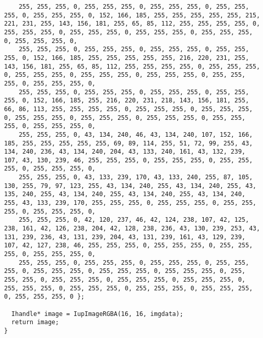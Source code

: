 \documentclass{ctexart}
\begin{document}
\begin{lstlisting}
    255, 255, 255, 0, 255, 255, 255, 0, 255, 255, 255, 0, 255, 255, 255, 0, 255, 255, 255, 0, 152, 166, 185, 255, 255, 255, 255, 255, 215, 221, 231, 255, 143, 156, 181, 255, 65, 85, 112, 255, 255, 255, 255, 0, 255, 255, 255, 0, 255, 255, 255, 0, 255, 255, 255, 0, 255, 255, 255, 0, 255, 255, 255, 0,
    255, 255, 255, 0, 255, 255, 255, 0, 255, 255, 255, 0, 255, 255, 255, 0, 152, 166, 185, 255, 255, 255, 255, 255, 216, 220, 231, 255, 143, 156, 181, 255, 65, 85, 112, 255, 255, 255, 255, 0, 255, 255, 255, 0, 255, 255, 255, 0, 255, 255, 255, 0, 255, 255, 255, 0, 255, 255, 255, 0, 255, 255, 255, 0,
    255, 255, 255, 0, 255, 255, 255, 0, 255, 255, 255, 0, 255, 255, 255, 0, 152, 166, 185, 255, 216, 220, 231, 218, 143, 156, 181, 255, 66, 86, 113, 255, 255, 255, 255, 0, 255, 255, 255, 0, 255, 255, 255, 0, 255, 255, 255, 0, 255, 255, 255, 0, 255, 255, 255, 0, 255, 255, 255, 0, 255, 255, 255, 0,
    255, 255, 255, 0, 43, 134, 240, 46, 43, 134, 240, 107, 152, 166, 185, 255, 255, 255, 255, 255, 69, 89, 114, 255, 51, 72, 99, 255, 43, 134, 240, 236, 43, 134, 240, 204, 43, 133, 240, 161, 43, 132, 239, 107, 43, 130, 239, 46, 255, 255, 255, 0, 255, 255, 255, 0, 255, 255, 255, 0, 255, 255, 255, 0,
    255, 255, 255, 0, 43, 133, 239, 170, 43, 133, 240, 255, 87, 105, 130, 255, 79, 97, 123, 255, 43, 134, 240, 255, 43, 134, 240, 255, 43, 135, 240, 255, 43, 134, 240, 255, 43, 134, 240, 255, 43, 134, 240, 255, 43, 133, 239, 170, 255, 255, 255, 0, 255, 255, 255, 0, 255, 255, 255, 0, 255, 255, 255, 0,
    255, 255, 255, 0, 42, 120, 237, 46, 42, 124, 238, 107, 42, 125, 238, 161, 42, 126, 238, 204, 42, 128, 238, 236, 43, 130, 239, 253, 43, 131, 239, 236, 43, 131, 239, 204, 43, 131, 239, 161, 43, 129, 239, 107, 42, 127, 238, 46, 255, 255, 255, 0, 255, 255, 255, 0, 255, 255, 255, 0, 255, 255, 255, 0,
    255, 255, 255, 0, 255, 255, 255, 0, 255, 255, 255, 0, 255, 255, 255, 0, 255, 255, 255, 0, 255, 255, 255, 0, 255, 255, 255, 0, 255, 255, 255, 0, 255, 255, 255, 0, 255, 255, 255, 0, 255, 255, 255, 0, 255, 255, 255, 0, 255, 255, 255, 0, 255, 255, 255, 0, 255, 255, 255, 0, 255, 255, 255, 0 };

  Ihandle* image = IupImageRGBA(16, 16, imgdata);
  return image;
}


\end{lstlisting}
\end{document}
